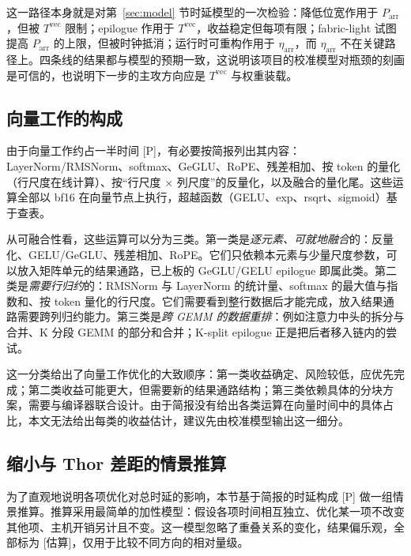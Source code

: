 \documentclass[a4paper,10.5pt]{ctexart}
\newcommand{\tP}{\textsf{[P]}}              %
\newcommand{\tE}{\textsf{[估算]}}           %
\begin{document}
这一路径本身就是对第~\ref{sec:model} 节时延模型的一次检验：降低位宽作用于 $P_{\text{arr}}$，但被 $T^{\text{vec}}$ 限制；epilogue 作用于 $T^{\text{vec}}$，收益稳定但每项有限；fabric-light 试图提高 $P_{\text{arr}}$ 的上限，但被时钟抵消；运行时可重构作用于 $\eta_{\text{arr}}$，而 $\eta_{\text{arr}}$ 不在关键路径上。四条线的结果都与模型的预期一致，这说明该项目的校准模型对瓶颈的刻画是可信的，也说明下一步的主攻方向应是 $T^{\text{vec}}$ 与权重装载。

\subsection{向量工作的构成}\label{sec:vecwork}

由于向量工作约占一半时间 \tP，有必要按简报列出其内容：LayerNorm/RMSNorm、softmax、GeGLU、RoPE、残差相加、按 token 的量化（行尺度在线计算）、按“行尺度 $\times$ 列尺度”的反量化，以及融合的量化尾。这些运算全部以 bf16 在向量节点上执行，超越函数（GELU、exp、rsqrt、sigmoid）基于查表。

从可融合性看，这些运算可以分为三类。第一类是\emph{逐元素、可就地融合}的：反量化、GELU/GeGLU、残差相加、RoPE。它们只依赖本元素与少量尺度参数，可以放入矩阵单元的结果通路，已上板的 GeGLU/GELU epilogue 即属此类。第二类是\emph{需要行归约}的：RMSNorm 与 LayerNorm 的统计量、softmax 的最大值与指数和、按 token 量化的行尺度。它们需要看到整行数据后才能完成，放入结果通路需要跨列归约能力。第三类是\emph{跨 GEMM 的数据重排}：例如注意力中头的拆分与合并、K 分段 GEMM 的部分和合并；K-split epilogue 正是把后者移入链内的尝试。

这一分类给出了向量工作优化的大致顺序：第一类收益确定、风险较低，应优先完成；第二类收益可能更大，但需要新的结果通路结构；第三类依赖具体的分块方案，需要与编译器联合设计。由于简报没有给出各类运算在向量时间中的具体占比，本文无法给出每类的收益估计，建议先由校准模型输出这一细分。

\subsection{缩小与 Thor 差距的情景推算}\label{sec:scenario}

为了直观地说明各项优化对总时延的影响，本节基于简报的时延构成 \tP{} 做一组情景推算。推算采用最简单的加性模型：假设各项时间相互独立、优化某一项不改变其他项、主机开销另计且不变。这一模型忽略了重叠关系的变化，结果偏乐观，全部标为 \tE，仅用于比较不同方向的相对量级。
\end{document}
